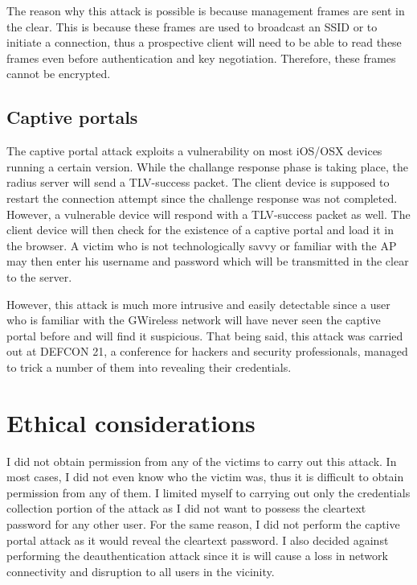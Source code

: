 \documentclass[twoside]{article}
\begin{document}
\begin{multicols}{2}
The reason why this attack is possible is because management frames are sent in the clear. This is because these frames are used to broadcast an SSID or to initiate a connection, thus a prospective client will need to be able to read these frames even before authentication and key negotiation. Therefore, these frames cannot be encrypted. 


\subsection{Captive portals}

The captive portal attack exploits a vulnerability on most iOS/OSX devices running a certain version. While the challange response phase is taking place, the radius server will send a TLV-success packet. The client device is supposed to restart the connection attempt since the challenge response was not completed. However, a vulnerable device will respond with a TLV-success packet as well. The client device will then check for the existence of a captive portal and load it in the browser. A victim who is not technologically savvy or familiar with the AP may then enter his username and password which will be transmitted in the clear to the server. 

However, this attack is much more intrusive and easily detectable since a user who is familiar with the GWireless network will have never seen the captive portal before and will find it suspicious. That being said, this attack\cite{8} was carried out at DEFCON 21, a conference for hackers and security professionals, managed to trick a number of them into revealing their credentials.





\section{Ethical considerations}

I did not obtain permission from any of the victims to carry out this attack. In most cases, I did not even know who the victim was, thus it is difficult to obtain permission from any of them. I limited myself to carrying out only the credentials collection portion of the attack as I did not want to possess the cleartext password for any other user. For the same reason, I did not perform the captive portal attack as it would reveal the cleartext password. I also decided against performing the deauthentication attack since it is will cause a loss in network connectivity and disruption to all users in the vicinity.




\end{multicols}
\end{document}
